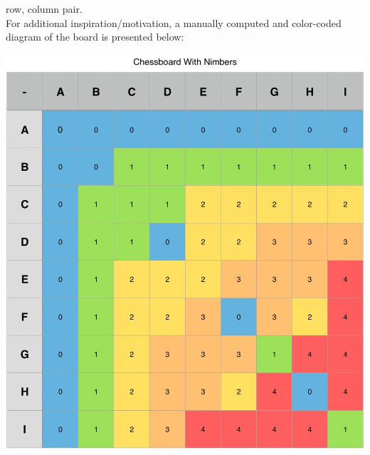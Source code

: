 \documentclass{article}
\begin{document}
row, column pair. \\
For additional inspiration/motivation, a manually computed and 
color-coded diagram of the board is presented below:
\begin{center}
  \includegraphics[scale=0.2]{chessboardWithNimbers}
\end{center}
\newpage
\end{document}
